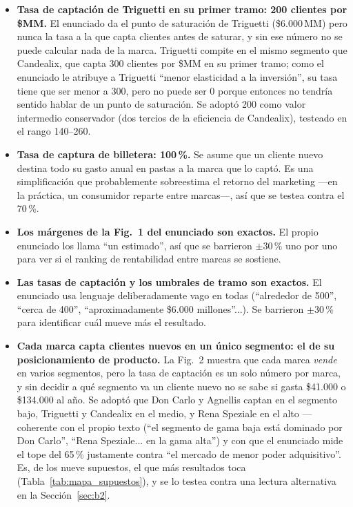 \documentclass[10pt,a4paper]{article}
\begin{document}
\begin{itemize}
  \item[\textbf{S1}] \textbf{Tasa de captación de Triguetti en su primer tramo:
    200 clientes por \$MM.} El enunciado da el punto de saturación de Triguetti
    (\$6.000\,MM) pero nunca la tasa a la que capta clientes antes de saturar,
    y sin ese número no se puede calcular nada de la marca. Triguetti compite
    en el mismo segmento que Candealix, que capta 300 clientes por \$MM en su
    primer tramo; como el enunciado le atribuye a Triguetti ``menor elasticidad
    a la inversión'', su tasa tiene que ser menor a 300, pero no puede ser 0
    porque entonces no tendría sentido hablar de un punto de saturación. Se
    adoptó 200 como valor intermedio conservador (dos tercios de la eficiencia
    de Candealix), testeado en el rango 140--260.

  \item[\textbf{S2}] \textbf{Tasa de captura de billetera: 100\,\%.} Se asume
    que un cliente nuevo destina todo su gasto anual en pastas a la marca que
    lo captó. Es una simplificación que probablemente sobreestima el retorno
    del marketing —en la práctica, un consumidor reparte entre marcas—, así
    que se testea contra el 70\,\%.

  \item[\textbf{S3}] \textbf{Los márgenes de la Fig.~1 del enunciado son
    exactos.} El propio enunciado los llama ``un estimado'', así que se
    barrieron $\pm30\,\%$ uno por uno para ver si el ranking de rentabilidad
    entre marcas se sostiene.

  \item[\textbf{S4}] \textbf{Las tasas de captación y los umbrales de tramo son
    exactos.} El enunciado usa lenguaje deliberadamente vago en todas
    (``alrededor de 500'', ``cerca de 400'', ``aproximadamente \$6.000
    millones''...). Se barrieron $\pm30\,\%$ para identificar cuál mueve más
    el resultado.

  \item[\textbf{S5}] \textbf{Cada marca capta clientes nuevos en un único
    segmento: el de su posicionamiento de producto.} La Fig.~2 muestra que cada
    marca \emph{vende} en varios segmentos, pero la tasa de captación es un
    solo número por marca, y sin decidir a qué segmento va un cliente nuevo no
    se sabe si gasta \$41.000 o \$134.000 al año. Se adoptó que Don Carlo y
    Agnellis captan en el segmento bajo, Triguetti y Candealix en el medio, y
    Rena Speziale en el alto —coherente con el propio texto (``el segmento de
    gama baja está dominado por Don Carlo'', ``Rena Speziale... en la gama
    alta'') y con que el enunciado mide el tope del 65\,\% justamente contra
    ``el mercado de menor poder adquisitivo''. Es, de los nueve supuestos, el
    que más resultados toca (Tabla~\ref{tab:mapa_supuestos}), y se lo testea
    contra una lectura alternativa en la Sección~\ref{sec:b2}.


\end{itemize}
\end{document}
